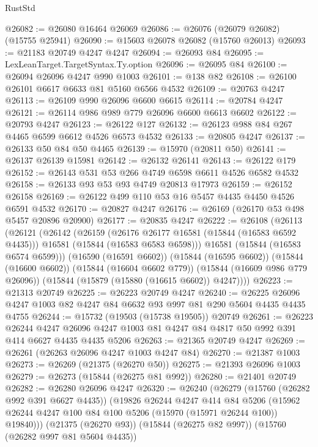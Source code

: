 \begin{lexlean}{RustStd}
\begin{coremodule}
@26082 := @26080 @16464 @26069
@26086 := @26076 (@26079 @26082) (@15755 @25941)
@26090 := @15603 @26078 @26082 (@15760 @26013)
@26093 := @21183 @20749 @4247 @4247
@26094 := @26093 @84
@26095 := LexLeanTarget.TargetSyntax.Ty.option
@26096 := @26095 @84
@26100 := @26094 @26096 @4247 @990 @1003
@26101 := @138 @82
@26108 := @26100 @26101 @6617 @6633 @81 @5160 @6566 @4532
@26109 := @20763 @4247
@26113 := @26109 @990 @26096 @6600 @6615
@26114 := @20784 @4247
@26121 := @26114 @986 @989 @779 @26096 @6600 @6613 @6602
@26122 := @20793 @4247
@26123 := @26122 @127
@26132 := @26123 @988 @84 @267 @4465 @6599 @6612 @4526 @6573 @4532
@26133 := @20805 @4247
@26137 := @26133 @50 @84 @50 @4465
@26139 := @15970 (@20811 @50)
@26141 := @26137 @26139 @15981
@26142 := @26132 @26141
@26143 := @26122 @179
@26152 := @26143 @531 @53 @266 @4749 @6598 @6611 @4526 @6582 @4532
@26158 := @26133 @93 @53 @93 @4749 @20813 @17973
@26159 := @26152 @26158
@26169 := @26122 @499 @110 @53 @16 @5457 @4435 @4450 @4526 @6591 @4532
@26170 := @20827 @4247
@26176 := @26169 (@26170 @53 @498 @5457 @20896 @20900)
@26177 := @20835 @4247
@26222 := @26108
    (@26113
      (@26121
        (@26142
          (@26159
            (@26176 @26177 @16581 (@15844 (@16583 @6592 @4435)))
            @16581
            (@15844 (@16583 @6583 @6598)))
          @16581
          (@15844 (@16583 @6574 @6599)))
        (@16590 (@16591 @6602))
        (@15844 (@16595 @6602))
        (@15844 (@16600 @6602))
        (@15844 (@16604 @6602 @779))
        (@15844 (@16609 @986 @779 @26096))
        (@15844 (@15879 (@15880 (@16615 @6602)) @4247))))
@26223 := @21313 @20749
@26225 := @26223 @20749 @4247
@26240 := @26225 @26096 @4247 @1003 @82 @4247 @84 @6632 @93 @997 @81 @290 @5604 @4435 @4435 @4755
@26244 := @15732 (@19503 (@15738 @19505)) @20749
@26261 := @26223
    @26244
    @4247
    @26096
    @4247
    @1003
    @81
    @4247
    @84
    @4817
    @50
    @992
    @391
    @414
    @6627
    @4435
    @4435
    @5206
@26263 := @21365 @20749 @4247
@26269 := @26261 (@26263 @26096 @4247 @1003 @4247 @84)
@26270 := @21387 @1003
@26273 := @26269 (@21375 (@26270 @50))
@26275 := @21393 @26096 @1003
@26279 := @26273 (@15844 (@26275 @81 @992))
@26280 := @21401 @20749
@26282 := @26280 @26096 @4247
@26320 := @26240
    (@26279
      (@15760 (@26282 @992 @391 @6627 @4435))
      (@19826
        @26244
        @4247
        @414
        @84
        @5206
        (@15962 @26244 @4247 @100 @84 @100 @5206 (@15970 (@15971 @26244 @100)) @19840)))
    (@21375 (@26270 @93))
    (@15844 (@26275 @82 @997))
    (@15760 (@26282 @997 @81 @5604 @4435))

\end{coremodule}
\end{lexlean}
